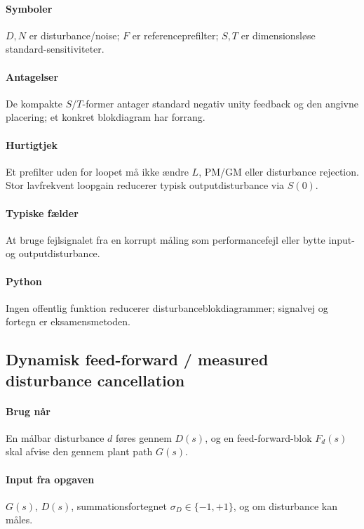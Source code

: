 \paragraph{Symboler}
\(D,N\) er disturbance/noise; \(F\) er referenceprefilter; \(S,T\) er
dimensionsløse standard-sensitiviteter.

\paragraph{Antagelser}
De kompakte \(S/T\)-former antager standard negativ unity feedback og den angivne
placering; et konkret blokdiagram har forrang.

\paragraph{Hurtigtjek}
Et prefilter uden for loopet må ikke ændre \(L\), PM/GM eller disturbance rejection.
Stor lavfrekvent loopgain reducerer typisk outputdisturbance via \(S(0)\).

\paragraph{Typiske fælder}
At bruge fejlsignalet fra en korrupt måling som performancefejl eller bytte input- og
outputdisturbance.

\paragraph{Python}
Ingen offentlig funktion reducerer disturbanceblokdiagrammer; signalvej og fortegn er
eksamensmetoden.

\subsection{Dynamisk feed-forward / measured disturbance cancellation}
\label{sec:feedforward}

\paragraph{Brug når}
En målbar disturbance \(d\) føres gennem \(D(s)\), og en feed-forward-blok \(F_d(s)\)
skal afvise den gennem plant path \(G(s)\).

\paragraph{Input fra opgaven}
\(G(s)\), \(D(s)\), summationsfortegnet \(\sigma_D\in\{-1,+1\}\), og om disturbance
kan måles.

